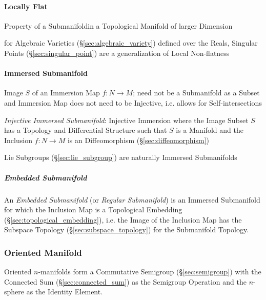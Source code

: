 \paragraph{Locally Flat}\label{sec:locally_flat}\hfill

Property of a Submanifoldin a Topological Manifold of larger Dimension

for Algebraic Varieties (\S\ref{sec:algebraic_variety}) defined over the Reals,
Singular Points (\S\ref{sec:singular_point}) are a generalization of Local
Non-flatness



\paragraph{Immersed Submanifold}\label{sec:immersed_submanifold}\hfill

Image $S$ of an Immersion Map $f : N \rightarrow M$; need not be a Submanifold
as a Subset and Immersion Map does not need to be Injective, i.e. allows for
Self-intersections

\emph{Injective Immersed Submanifold}: Injective Immersion where the Image
Subset $S$ has a Topology and Differential Structure such that $S$ is a
Manifold and the Inclusion $f : N \rightarrow M$ is an Diffeomorphism
(\S\ref{sec:diffeomorphism})

\fist Lie Subgroups (\S\ref{sec:lie_subgroup}) are naturally Immersed
Submanifolds



\subparagraph{Embedded Submanifold}\label{sec:embedded_submanifold}\hfill

An \emph{Embedded Submanifold} (or \emph{Regular Submanifold}) is an Immersed
Submanifold for which the Inclusion Map is a Topological Embedding
(\S\ref{sec:topological_embedding}), i.e. the Image of the Inclusion Map
has the Subspace Topology (\S\ref{sec:subspace_topology}) for the Submanifold
Topology.



\subsubsection{Oriented Manifold}\label{sec:oriented_manifold}

Oriented $n$-manifolds form a Commutative Semigroup
(\S\ref{sec:semigroup}) with the Connected Sum
(\S\ref{sec:connected_sum}) as the Semigroup Operation and the
$n$-sphere as the Identity Element.



